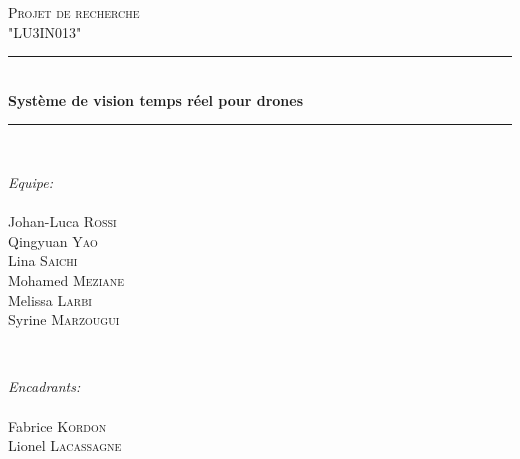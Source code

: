 \documentclass[12pt]{article}
\begin{document}
\begin{titlepage}

\newcommand{\HRule}{\rule{\linewidth}{0.5mm}} %

\center %
 


\textsc{\Large Projet de recherche}\\[0.5cm] %
\textsc{\large "LU3IN013"}\\[0.5cm] %


\HRule \\[0.4cm]
{\huge \bfseries Système de vision temps réel pour drones}\\[0.4cm] %
\HRule \\[1.5cm]
 

\begin{minipage}{0.4\textwidth}
\begin{flushleft} \large
\emph{Equipe:}\\~\\

Johan-Luca \textsc{Rossi}\\
Qingyuan \textsc{Yao}\\
Lina \textsc{Saichi}\\
Mohamed \textsc{Meziane}\\
Melissa \textsc{Larbi}\\
Syrine \textsc{Marzougui}\\
\end{flushleft}
\end{minipage}
~
\begin{minipage}{0.4\textwidth}
\begin{flushright} \large
\emph{Encadrants:} \\~\\
Fabrice \textsc{Kordon}\\ %
Lionel \textsc{Lacassagne}\\~\\~\\~\\~\\
\end{flushright}
\end{minipage}\\[2cm]


\end{titlepage}
\end{document}
